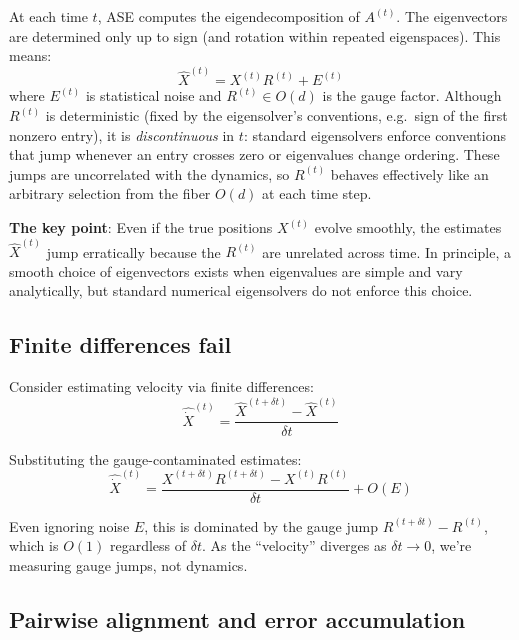 \documentclass{article}
\theoremstyle{plain}
\theoremstyle{definition}
\theoremstyle{remark}
\begin{document}
At each time $t$, ASE computes the eigendecomposition of $A^{(t)}$.
The eigenvectors are determined only up to sign (and rotation within repeated eigenspaces).
This means:
\begin{equation}
\hat{X}^{(t)} = X^{(t)} R^{(t)} + E^{(t)}
\end{equation}
where $E^{(t)}$ is statistical noise and $R^{(t)} \in O(d)$ is the gauge factor.
Although $R^{(t)}$ is deterministic (fixed by the eigensolver's conventions, e.g.\ sign of the first nonzero entry), it is \emph{discontinuous} in $t$: standard eigensolvers enforce conventions that jump whenever an entry crosses zero or eigenvalues change ordering.
These jumps are uncorrelated with the dynamics, so $R^{(t)}$ behaves effectively like an arbitrary selection from the fiber $O(d)$ at each time step.

\textbf{The key point}: Even if the true positions $X^{(t)}$ evolve smoothly, the estimates $\hat{X}^{(t)}$ jump erratically because the $R^{(t)}$ are unrelated across time.
In principle, a smooth choice of eigenvectors exists when eigenvalues are simple and vary analytically, but standard numerical eigensolvers do not enforce this choice.

\subsection{Finite differences fail}

Consider estimating velocity via finite differences:
\begin{equation}
\hat{\dot{X}}^{(t)} = \frac{\hat{X}^{(t + \delta t)} - \hat{X}^{(t)}}{\delta t}
\end{equation}

Substituting the gauge-contaminated estimates:
\begin{equation}
\hat{\dot{X}}^{(t)} = \frac{X^{(t+\delta t)} R^{(t+\delta t)} - X^{(t)} R^{(t)}}{\delta t} + O(E)
\end{equation}

Even ignoring noise $E$, this is dominated by the gauge jump $R^{(t+\delta t)} - R^{(t)}$, which is $O(1)$ regardless of $\delta t$.
As the ``velocity'' diverges as $\delta t \to 0$, we're measuring gauge jumps, not dynamics.



\subsection{Pairwise alignment and error accumulation}\label{sec:alignment-accumulation}
\end{document}
